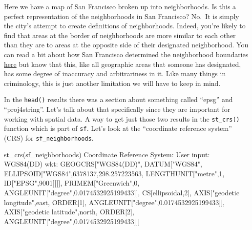 \documentclass[
  12pt,
  openany]{book}
\newenvironment{Shaded}{\begin{snugshade}}{\end{snugshade}}
\newcommand{\DecValTok}[1]{\textcolor[rgb]{0.06,0.06,0.06}{#1}}
\newcommand{\FloatTok}[1]{\textcolor[rgb]{0.06,0.06,0.06}{#1}}
\newcommand{\FunctionTok}[1]{\textcolor[rgb]{0,0,0}{#1}}
\newcommand{\NormalTok}[1]{#1}
\newcommand{\SpecialCharTok}[1]{\textcolor[rgb]{0,0,0}{#1}}
\newcommand{\StringTok}[1]{\textcolor[rgb]{0.5,0.5,0.5}{#1}}
\begin{document}
Here we have a map of San Francisco broken up into neighborhoods. Is this a perfect representation of the neighborhoods in San Francisco? No.~It is simply the city's attempt to create definitions of neighborhoods. Indeed, you're likely to find that areas at the border of neighborhoods are more similar to each other than they are to areas at the opposite side of their designated neighborhood. You can read a bit about how San Francisco determined the neighborhood boundaries \href{https://data.sfgov.org/Geographic-Locations-and-Boundaries/Analysis-Neighborhoods/p5b7-5n3h}{here} but know that this, like all geographic areas that someone has designated, has some degree of inaccuracy and arbitrariness in it. Like many things in criminology, this is just another limitation we will have to keep in mind.

In the \texttt{head()} results there was a section about something called ``epsg'' and ``proj4string''. Let's talk about that specifically since they are important for working with spatial data. A way to get just those two results in the \texttt{st\_crs()} function which is part of \texttt{sf}. Let's look at the ``coordinate reference system'' (CRS) for \texttt{sf\_neighborhoods}.

\begin{Shaded}
\begin{Highlighting}[]
\FunctionTok{st\_crs}\NormalTok{(sf\_neighborhoods)}
\NormalTok{Coordinate Reference System}\SpecialCharTok{:}
\NormalTok{  User input}\SpecialCharTok{:} \FunctionTok{WGS84}\NormalTok{(DD) }
\NormalTok{  wkt}\SpecialCharTok{:}
\NormalTok{GEOGCRS[}\StringTok{"WGS84(DD)"}\NormalTok{,}
\NormalTok{    DATUM[}\StringTok{"WGS84"}\NormalTok{,}
\NormalTok{        ELLIPSOID[}\StringTok{"WGS84"}\NormalTok{,}\DecValTok{6378137}\NormalTok{,}\FloatTok{298.257223563}\NormalTok{,}
\NormalTok{            LENGTHUNIT[}\StringTok{"metre"}\NormalTok{,}\DecValTok{1}\NormalTok{,}
\NormalTok{                ID[}\StringTok{"EPSG"}\NormalTok{,}\DecValTok{9001}\NormalTok{]]]],}
\NormalTok{    PRIMEM[}\StringTok{"Greenwich"}\NormalTok{,}\DecValTok{0}\NormalTok{,}
\NormalTok{        ANGLEUNIT[}\StringTok{"degree"}\NormalTok{,}\FloatTok{0.0174532925199433}\NormalTok{]],}
\NormalTok{    CS[ellipsoidal,}\DecValTok{2}\NormalTok{],}
\NormalTok{        AXIS[}\StringTok{"geodetic longitude"}\NormalTok{,east,}
\NormalTok{            ORDER[}\DecValTok{1}\NormalTok{],}
\NormalTok{            ANGLEUNIT[}\StringTok{"degree"}\NormalTok{,}\FloatTok{0.0174532925199433}\NormalTok{]],}
\NormalTok{        AXIS[}\StringTok{"geodetic latitude"}\NormalTok{,north,}
\NormalTok{            ORDER[}\DecValTok{2}\NormalTok{],}
\NormalTok{            ANGLEUNIT[}\StringTok{"degree"}\NormalTok{,}\FloatTok{0.0174532925199433}\NormalTok{]]]}
\end{Highlighting}
\end{Shaded}
\end{document}
